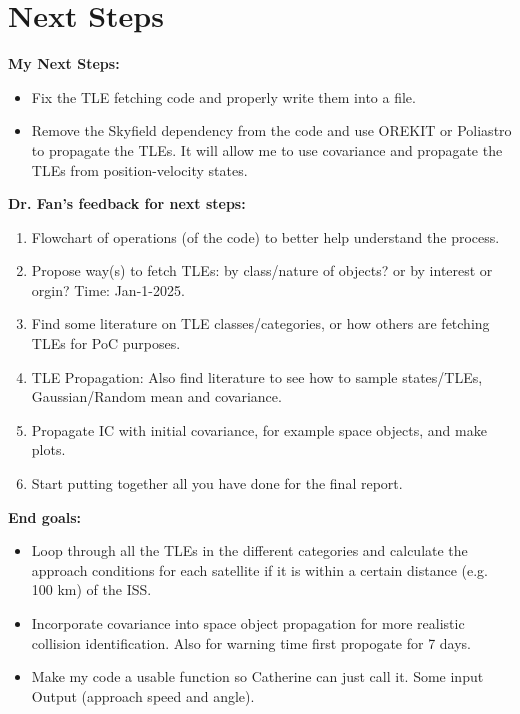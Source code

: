 \documentclass[12pt]{report}
\begin{document}
\chapter*{Next Steps}

\textbf{My Next Steps:}
\begin{itemize}
  \item Fix the TLE fetching code and properly write them into a file.
  \item Remove the Skyfield dependency from the code and use OREKIT or Poliastro to propagate the TLEs. It will allow me to use covariance and propagate the TLEs from position-velocity states.
\end{itemize}

\noindent \textbf{Dr. Fan's feedback for next steps:}
\begin{enumerate}
  \item Flowchart of operations (of the code) to better help understand the process.
  \item Propose way(s) to fetch TLEs: by class/nature of objects? or by interest or orgin? Time: Jan-1-2025.
  \item Find some literature on TLE classes/categories, or how others are fetching TLEs for PoC purposes.
  \item TLE Propagation: Also find literature to see how to sample states/TLEs, Gaussian/Random mean and covariance.
  \item Propagate IC with initial covariance, for example space objects, and make plots.
  \item Start putting together all you have done for the final report.
\end{enumerate}

\noindent \textbf{End goals:}
\begin{itemize}
  \item Loop through all the TLEs in the different categories and calculate the approach conditions for each satellite if it is within a certain distance (e.g. 100 km) of the ISS.
  \item Incorporate covariance into space object propagation for more realistic collision identification. Also for warning time first propogate for 7 days. 
  \item Make my code a usable function so Catherine can just call it. Some input \textrightarrow{} Output (approach speed and angle).
\end{itemize}
\end{document}
